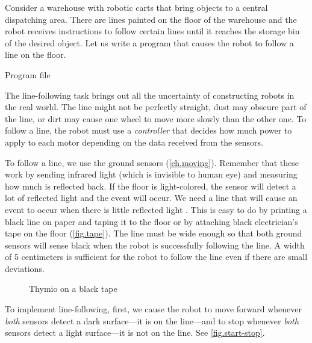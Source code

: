 \label{ch.line}

Consider a warehouse with robotic carts that bring objects to a central
dispatching area. There are lines painted on the floor of the warehouse
and the robot receives instructions to follow certain lines until it
reaches the storage bin of the desired object. Let us write a program
that causes the robot to follow a line on the floor.

{\raggedleft \hfill Program file }

The line-following task brings out all the uncertainty of constructing
robots in the real world. The line might not be perfectly straight, dust
may obscure part of the line, or dirt may cause one wheel to move more
slowly than the other one. To follow a line, the robot must use a
\emph{controller} that decides how much power to apply to each motor
depending on the data received from the sensors.


To follow a line, we use the ground sensors (\cref{ch.moving}). Remember
that these work by sending infrared light (which is invisible to human
eye) and measuring how much is reflected back. If the floor is
light-colored, the sensor will detect a lot of reflected light and the
event  will occur. We need a line that will cause
an event to occur when there is little reflected light
. This is easy to do by printing a black line on
paper and taping it to the floor or by attaching black electrician's
tape on the floor (\cref{fig.tape}). The line must be wide enough so
that both ground sensors will sense black when the robot is successfully
following the line. A width of 5 centimeters is sufficient for the robot
to follow the line even if there are small deviations.

\begin{figure}
\hfill
{}
\caption{Thymio on a black tape}
\end{figure}

To implement line-following, first, we cause the robot to move forward
whenever \emph{both} sensors detect a dark surface---it is on the
line---and to stop whenever \emph{both} sensors detect a light
surface---it is not on the line. See \cref{fig.start-stop}.
                  
